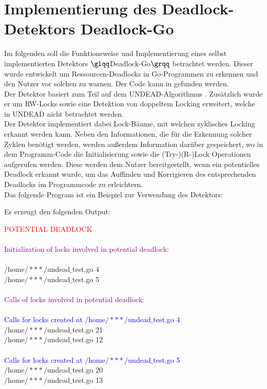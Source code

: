 \chapter{Implementierung des Deadlock-Detektors \glqq Deadlock-Go \grqq} \label{Kap::Implementaion}
Im folgenden soll die Funktionsweise und Implementierung eines selbst implementierten 
Detektors $\glqq$Deadlock-Go$\grqq$ 
betrachtet werden. Dieser wurde entwickelt um Ressourcen-Deadlocks in Go-Programmen
zu erkennen und den Nutzer vor solchen zu warnen. Der Code kann in 
\cite{implementation} gefunden werden.\\
Der Detektor basiert zum Teil auf dem UNDEAD-Algorithmus \cite{zhou}. 
Zusätzlich wurde er um RW-Locks sowie eine Detektion von doppeltem Locking 
erweitert, welche in UNDEAD nicht betrachtet werden.\\
Der Detektor implementiert dabei Lock-Bäume, mit welchen zyklisches Locking 
erkannt werden kann. Neben den Informationen, die für die Erkennung solcher 
Zyklen benötigt werden, werden außerdem Information darüber gespeichert, wo in dem 
Programm-Code die Initialisierung sowie die (Try-)(R-)Lock Operationen aufgerufen werden. 
Diese werden dem Nutzer bereitgestellt, wenn ein potentielles 
Deadlock erkannt wurde, um das Auffinden und Korrigieren des entsprechenden Deadlocks 
im Programmcode zu erleichtern.\\
Das folgende Program ist ein Beispiel zur Verwendung des Detektors:
\begin{figure}[H]
  
\end{figure}
\newpage
Es erzeugt den folgenden Output:

\begin{mdframed}[leftmargin=10pt,rightmargin=10pt]
\textcolor{red}{POTENTIAL DEADLOCK}\\\\
\textcolor{purple}{Initialization of locks involved in potential deadlock:}\\\\
$/$home$/***/$undead$\_$test.go 4\\
$/$home$/***/$undead$\_$test.go 5\\\\
\textcolor{purple}{Calls of locks involved in potential deadlock:}\\\\
\textcolor{blue}{Calls for locks created at $/$home$/***/$undead$\_$test.go 4}\\
$/$home$/***/$undead$\_$test.go 21\\
$/$home$/***/$undead$\_$test.go 12\\\\
\textcolor{blue}{Calls for locks created at $/$home$/***/$undead$\_$test.go 5}\\
$/$home$/***/$undead$\_$test.go 20\\
$/$home$/***/$undead$\_$test.go 13\
\end{mdframed}

